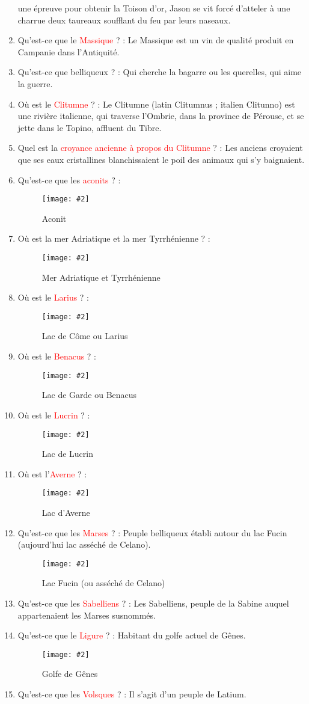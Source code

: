 \documentclass[a4paper, 11pt, hidelinks]{article}
\newcommand{\img}[4]{\begin{figure}[!ht]
    \centering
    \texttt{[image: \#2]}
    \caption{#3}
    \label{#4}
    \end{figure} }
\begin{document}
\begin{enumerate}
            une épreuve pour obtenir la Toison d'or, Jason se vit forcé d'atteler à une charrue deux taureaux soufflant du feu par leurs naseaux.
      \item Qu'est-ce que le \textcolor{red}{Massique} ? : Le Massique est un vin de qualité produit en Campanie dans l'Antiquité.
      \item Qu'est-ce que belliqueux ? : Qui cherche la bagarre ou les querelles, qui aime la guerre.
      \item Où est le \textcolor{red}{Clitumne} ? : Le Clitumne (latin Clitumnus ; italien Clitunno) est une rivière italienne, qui traverse
            l'Ombrie, dans la province de Pérouse, et se jette dans le Topino, affluent du Tibre.
      \item Quel est la \textcolor{red}{croyance ancienne à propos du Clitumne} ? : Les anciens croyaient que ses eaux cristallines blanchissaient
            le poil des animaux qui s'y baignaient.
      \item Qu'est-ce que les \textcolor{red}{aconits} ? :
            \img{0.5}{Aconit.jpg}{Aconit}{78}
            \newpage
      \item Où est la mer Adriatique et la mer Tyrrhénienne ? :
            \img{0.3}{Mer Adriatique et Tyrrhénienne.jpg}{Mer Adriatique et Tyrrhénienne}{79}
      \item Où est le \textcolor{red}{Larius} ? :
            \img{0.3}{Come.png}{Lac de Côme ou Larius}{80}
      \item Où est le \textcolor{red}{Benacus} ? :
            \img{0.3}{Garde.png}{Lac de Garde ou Benacus}{81}
            \newpage
      \item Où est le \textcolor{red}{Lucrin} ? :
            \img{0.3}{Lucrin.png}{Lac de Lucrin}{82}
      \item Où est l'\textcolor{red}{Averne} ? :
            \img{0.3}{Averne.png}{Lac d'Averne}{83}
      \item Qu'est-ce que les \textcolor{red}{Marses} ? : Peuple belliqueux établi autour du lac Fucin (aujourd'hui lac asséché de Celano).
            \img{0.3}{Celano.png}{Lac Fucin (ou asséché de Celano)}{84}
      \item Qu'est-ce que les \textcolor{red}{Sabelliens} ? : Les Sabelliens, peuple de la Sabine auquel appartenaient les Marses susnommés.
      \item Qu'est-ce que le \textcolor{red}{Ligure} ? : Habitant du golfe actuel de Gênes.
            \img{0.3}{Gênes.png}{Golfe de Gênes}{85}
            \newpage
      \item Qu'est-ce que les \textcolor{red}{Volsques} ? : Il s'agit d'un peuple de Latium.

\end{enumerate}
\end{document}
